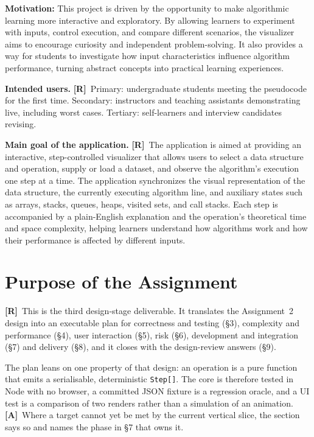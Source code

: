 \documentclass[11pt,a4paper]{article}
\newcommand{\R}{\textcolor{reqc}{\textbf{[R]}}}     %
\newcommand{\A}{\textcolor{asmc}{\textbf{[A]}}}     %
\newcommand{\ct}[1]{\texttt{#1}}
\begin{document}
\medskip
\noindent\textbf{Motivation:} This project is driven by the opportunity to make algorithmic learning more interactive and exploratory. By allowing learners to experiment with inputs, control execution, and compare different scenarios, the visualizer aims to encourage curiosity and independent problem-solving. It also provides a way for students to investigate how input characteristics influence algorithm performance, turning abstract concepts into practical learning experiences.
\medskip

\noindent\textbf{Intended users.} \R\ Primary: undergraduate students meeting the
pseudocode for the first time. Secondary: instructors and teaching assistants demonstrating
live, including worst cases. Tertiary: self-learners and interview candidates revising.

\medskip
\noindent\textbf{Main goal of the application.} \R\ The application is aimed at providing an interactive, step-controlled visualizer that allows users to select a data structure and operation, supply or load a dataset, and observe the algorithm's execution one step at a time. The application synchronizes the visual representation of the data structure, the currently executing algorithm line, and auxiliary states such as arrays, stacks, queues, heaps, visited sets, and call stacks. Each step is accompanied by a plain-English explanation and the operation's theoretical time and space complexity, helping learners understand how algorithms work and how their performance is affected by different inputs.

\section{Purpose of the Assignment}

\R\ This is the third design-stage deliverable. It translates the Assignment~2 design into an
executable plan for correctness and testing (\S3), complexity and performance (\S4), user
interaction (\S5), risk (\S6), development and integration (\S7) and delivery (\S8), and it
closes with the design-review answers (\S9).

The plan leans on one property of that design: an operation is a pure function that emits a
serialisable, deterministic \ct{Step[]}. The core is therefore tested in Node with no browser,
a committed JSON fixture is a regression oracle, and a UI test is a comparison of two renders
rather than a simulation of an animation. \A\ Where a target cannot yet be met by the current
vertical slice, the section says so and names the phase in \S7 that owns it.
\end{document}
